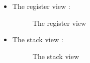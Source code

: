 \documentclass[10pt]{report}
\begin{document}
\begin{itemize}
\begin{figure}[H]
\end{figure}
\item The register view :\newline
\begin{figure}[H]
\centering
{}
\caption{The register view}
\end{figure}
\item The stack view :\newline
\begin{figure}[H]
\centering
{}
\caption{The stack view}
\end{figure}
\end{itemize}
\end{document}
